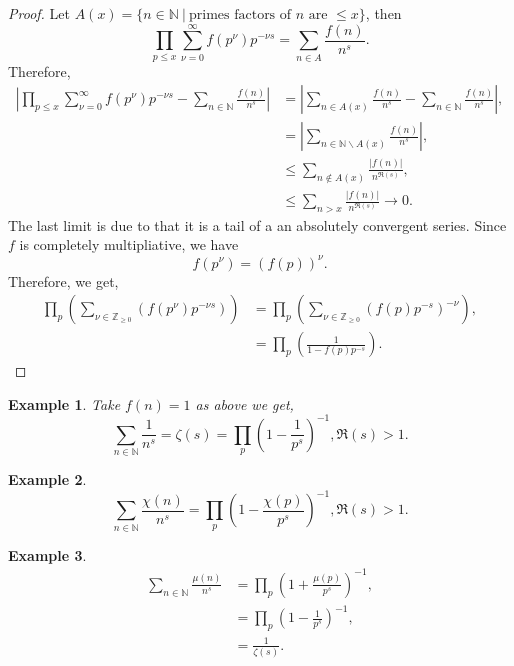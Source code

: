 \documentclass{article}
\newtheorem{example}{Example}[section]
\newcommand{\N}[0]{\mathbb{N}}
\newcommand{\Z}[0]{\mathbb{Z}}
\newcommand{\sep}[0]{\:|\:}
\begin{document}
\begin{proof}
  Let $A(x) = \{n\in\N\sep \text{primes factors of $n$ are $\leq x$}\}$, then
  \begin{equation*}
    \prod_{p\leq x}\sum_{\nu=0}^\infty f(p^\nu)p^{-\nu s} = \sum_{n\in A}{\frac {f(n)} {n^s}}.
  \end{equation*}
  Therefore,
  \begin{align*}
    \left\vert\prod_{p\leq x}\sum_{\nu=0}^\infty f(p^\nu)p^{-\nu s} - \sum_{n\in\N}{\frac {f(n)} {n^s}}\right\vert & = \left\vert\sum_{n\in A(x)}{\frac {f(n)} {n^s}}-\sum_{n\in\N}{\frac {f(n)} {n^s}}\right\vert,\\
    & = \left\vert\sum_{n\in \N\backslash A(x)}{\frac {f(n)} {n^s}}\right\vert,\\
    &\leq \sum_{n\not\in A(x)}{\frac {\vert f(n)\vert} {n^{\Re(s)}}},\\
    &\leq \sum_{n>x}{\frac {\vert f(n)\vert} {n^{\Re(s)}}}\to 0.
  \end{align*}
  The last limit is due to that it is a tail of a an absolutely convergent series. 
  Since $f$ is completely multipliative, we have 
  \begin{equation*}
    f(p^\nu) = (f(p))^{\nu}.
  \end{equation*}
  Therefore, we get,
  \begin{align*}
    \prod_{p}\left(\sum_{\nu\in\Z_{\geq0}}(f(p^\nu)p^{-\nu s})\right) & = \prod_p\left(\sum_{\nu\in\Z_{\geq0}}(f(p)p^{-s})^{-\nu}\right),\\
    & = \prod_{p}\left({\frac 1 {1-f(p)p^{-s}}}\right).
  \end{align*}
\end{proof}

\begin{example}
  Take $f(n)=1$ as above we get,
  \begin{equation*}
    \sum_{n\in\N}{\frac 1 {n^s}} = \zeta(s) = \prod_{p}\left(1-{\frac 1 {p^s}}\right)^{-1}, \Re(s)>1.
  \end{equation*}
\end{example}

\begin{example}
  \begin{equation*}
    \sum_{n\in\N}{\frac {\chi(n)} {n^s}} = \prod_{p}\left(1-{\frac {\chi(p)} {p^s}}\right)^{-1}, \Re(s)>1.
  \end{equation*}
\end{example}

\begin{example}
  \begin{align*}
    \sum_{n\in\N}{\frac {\mu(n)} {n^s}} & = \prod_{p}\left(1+{\frac {\mu(p)} {p^s}}\right)^{-1},\\
    & = \prod_{p}\left(1-{\frac 1 {p^s}}\right)^{-1},\\
    & = {\frac 1 {\zeta(s)}}.
  \end{align*}
\end{example}
\end{document}
